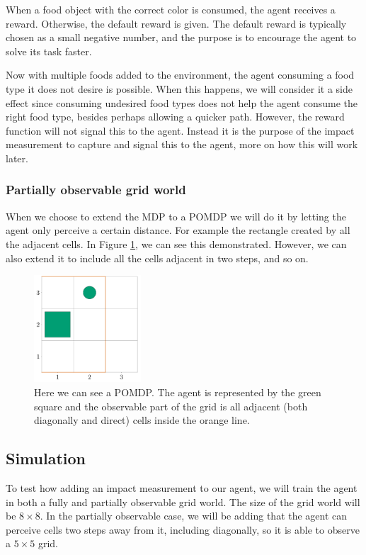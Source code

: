 \documentclass[12pt,A4]{report}
\theoremstyle{definition}
\begin{document}
When a food object with the correct color is consumed, the agent receives a reward. Otherwise, the default reward is given. The default reward is typically chosen as a small negative number, and the purpose is to encourage the agent to solve its task faster.

Now with multiple foods added to the environment, the agent consuming a food type it does not desire is possible. When this happens, we will consider it a side effect since consuming undesired food types does not help the agent consume the right food type, besides perhaps allowing a quicker path. However, the reward function will not signal this to the agent. Instead it is the purpose of the impact measurement to capture and signal this to the agent, more on how this will work later.

\subsubsection{Partially observable grid world}
When we choose to extend the MDP to a POMDP we will do it by letting the agent only perceive a certain distance. For example the rectangle created by all the adjacent cells. In Figure \ref{fig:redline}, we can see this demonstrated. However, we can also extend it to include all the cells adjacent in two steps, and so on. 

\begin{figure}[H]
  \centering
  \includegraphics[width=4cm]{"./figures/s2_redline.png"}
  \caption{Here we can see a POMDP. The agent is represented by the green square and the observable part of the grid is all adjacent (both diagonally and direct) cells inside the orange line. }
  \label{fig:redline}
\end{figure}

\subsection{Simulation}
To test how adding an impact measurement to our agent, we will train the agent in both a fully and partially observable grid world. The size of the grid world will be $8\times8$. In the partially observable case, we will be adding that the agent can perceive cells two steps away from it, including diagonally, so it is able to observe a $5\times5$ grid.
\end{document}
